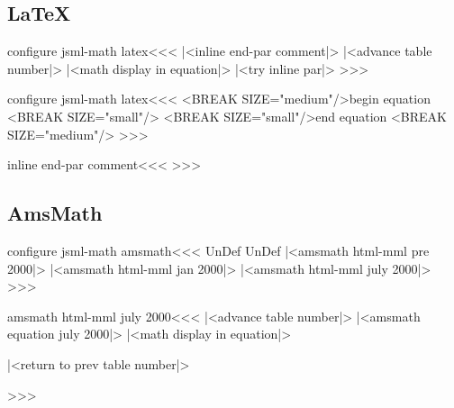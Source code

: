 {\subsection{LaTeX}

\<configure jsml-math latex\><<<
  {\IgnorePar|<inline end-par comment|>\EndP
   |<advance table number|>%
   \IgnorePar
     |<math display in equation|>}
  {\ifvmode \IgnorePar\fi\EndP
   \let\@eqnnum\empty
  }
  {%
   |<try inline par|>}
>>>



\<configure jsml-math latex\><<<
   {<BREAK SIZE="medium"/>begin equation 
    <BREAK SIZE="small"/>
   }
   {<BREAK SIZE="small"/>end equation \theequation
    <BREAK SIZE="medium"/>}
>>>



\<inline end-par comment\><<<
\ifvmode\else {}\fi
>>>



\subsection{AmsMath}






\<configure jsml-math amsmath\><<<
\ifx \mathdisplay@@pop\:UnDef
   \ifx \emdf@La\:UnDef
      |<amsmath html-mml pre 2000|>
   \else
      |<amsmath html-mml jan 2000|>
   \fi
\else
   |<amsmath html-mml july 2000|>
\fi
>>>


\<amsmath html-mml july 2000\><<<
  {\ifvmode \IgnorePar\fi\EndP
   |<advance table number|>%
   |<amsmath equation july 2000|>%
   |<math display in equation|>%
  }
  {\ifvmode \IgnorePar\fi\EndP
   \let\@eqnnum\empty
  }
  {\ifvmode \IgnorePar\fi\EndP
    |<return to prev table number|>%
    \ShowPar\IgnoreIndent\par}
>>>



}
